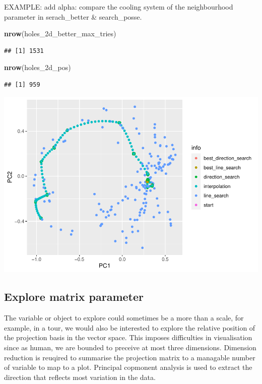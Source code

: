 \documentclass[12pt]{article}
\newenvironment{Shaded}{\begin{snugshade}}{\end{snugshade}}
\newcommand{\KeywordTok}[1]{\textcolor[rgb]{0.13,0.29,0.53}{\textbf{#1}}}
\newcommand{\NormalTok}[1]{#1}
\begin{document}
EXAMPLE: add alpha: compare the cooling system of the neighbourhood
parameter in serach\_better \& search\_posse.

\begin{Shaded}
\begin{Highlighting}[]
\KeywordTok{nrow}\NormalTok{(holes_2d_better_max_tries)}
\end{Highlighting}
\end{Shaded}

\begin{verbatim}
## [1] 1531
\end{verbatim}

\begin{Shaded}
\begin{Highlighting}[]
\KeywordTok{nrow}\NormalTok{(holes_2d_pos)}
\end{Highlighting}
\end{Shaded}

\begin{verbatim}
## [1] 959
\end{verbatim}

\includegraphics{paper_files/figure-latex/unnamed-chunk-9-1.pdf}

\hypertarget{explore-matrix-parameter}{%
\subsection{Explore matrix parameter}\label{explore-matrix-parameter}}

The variable or object to explore could sometimes be a more than a
scale, for example, in a tour, we would also be interested to explore
the relative position of the projection basis in the vector space. This
imposes difficulties in visualisation since as human, we are bounded to
preceive at most three dimensions. Dimension reduction is reuqired to
summarise the projection matrix to a managable number of variable to map
to a plot. Principal copmonent analysis is used to extract the direction
that reflects most variation in the data.
\end{document}
